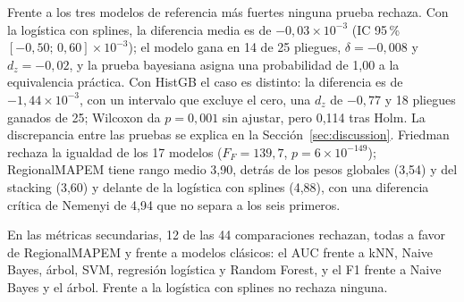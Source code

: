 \documentclass[11pt,a4paper]{article}
\begin{document}
Frente a los tres modelos de referencia más fuertes ninguna prueba rechaza. Con la logística con splines, la diferencia media es de $-0{,}03\times10^{-3}$ (IC 95\,\% $[-0{,}50;\,0{,}60]\times10^{-3}$); el modelo gana en 14 de 25 pliegues, $\delta=-0{,}008$ y $d_z=-0{,}02$, y la prueba bayesiana asigna una probabilidad de 1,00 a la equivalencia práctica. Con HistGB el caso es distinto: la diferencia es de $-1{,}44\times10^{-3}$, con un intervalo que excluye el cero, una $d_z$ de $-0{,}77$ y 18 pliegues ganados de 25; Wilcoxon da $p=0{,}001$ sin ajustar, pero 0,114 tras Holm. La discrepancia entre las pruebas se explica en la Sección~\ref{sec:discussion}. Friedman rechaza la igualdad de los 17 modelos ($F_F=139{,}7$, $p=6\times10^{-149}$); RegionalMAPEM tiene rango medio 3,90, detrás de los pesos globales (3,54) y del stacking (3,60) y delante de la logística con splines (4,88), con una diferencia crítica de Nemenyi de 4,94 que no separa a los seis primeros.

En las métricas secundarias, 12 de las 44 comparaciones rechazan, todas a favor de RegionalMAPEM y frente a modelos clásicos: el AUC frente a kNN, Naive Bayes, árbol, SVM, regresión logística y Random Forest, y el F1 frente a Naive Bayes y el árbol. Frente a la logística con splines no rechaza ninguna.
\end{document}
